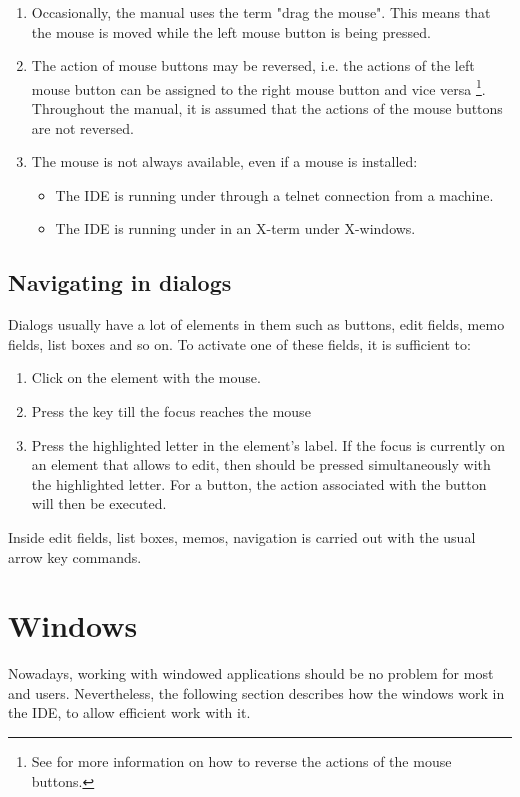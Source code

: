\begin{remark}
\begin{enumerate}
\item Occasionally, the manual uses the term "drag the mouse". This
means that the mouse is moved while the left mouse button is being
pressed.
\item
The action of mouse buttons may be reversed, i.e. the actions of the left
mouse button can be assigned to the right mouse button and vice versa
\footnote{See  for more information on how to reverse the
actions of the mouse buttons.}. Throughout the manual, it is assumed
that the actions of the mouse buttons are not reversed.
\item
The mouse is not always available, even if a mouse is installed:
\begin{itemize}
\item The IDE is running under \linux through a telnet connection from
a \windows machine.
\item The IDE is running under \linux in an X-term under X-windows.
\end{itemize}
\end{enumerate}
\end{remark}
%
%
\subsection{Navigating in dialogs}
\label{se:navigatingdialogs}
Dialogs usually have a lot of elements in them such as buttons, edit fields,
memo fields, list boxes and so on. To activate one of these fields, it is
sufficient to:
\begin{enumerate}
\item Click on the element with the mouse.
\item Press the  key till the focus reaches the mouse
\item Press the highlighted letter in the element's label. If the focus
is currently on an element that allows to edit, then  should be
pressed simultaneously with the highlighted letter. For a button, the action
associated with the button will then be executed.
\end{enumerate}
Inside edit fields, list boxes, memos, navigation is carried out with the
usual arrow key commands.

\section{Windows}
\label{se:windows}
Nowadays, working with windowed applications should be no problem for
most \windows and \linux users. Nevertheless, the following section
describes how the windows work in the \fpc IDE, to allow efficient
work with it.
%
%
